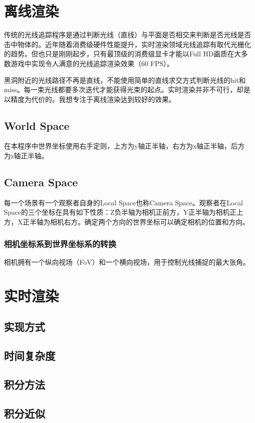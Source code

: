 \section{离线渲染}
传统的光线追踪程序是通过判断光线（直线）与平面是否相交来判断是否光线是否击中物体的。近年随着消费级硬件性能提升，实时渲染领域光线追踪有取代光栅化的趋势。但也只是刚刚起步，只有最顶级的消费级显卡才能以Full HD画质在大多数游戏中实现令人满意的光线追踪渲染效果（60 FPS）。

黑洞附近的光线路径不再是直线，不能使用简单的直线求交方式判断光线的hit和miss。每一束光线都要多次迭代才能获得光束的起点。实时渲染并非不可行，却是以精度为代价的。我想专注于离线渲染达到较好的效果。
\subsection{World Space}
在本程序中世界坐标使用右手定则，上方为y轴正半轴，右方为x轴正半轴，后方为z轴正半轴。



\subsection{Camera Space}
每一个场景有一个观察者自身的Local Space也称Camera Space。观察者在Local Space的三个坐标在具有如下性质：Z负半轴为相机正前方，Y正半轴为相机正上方，X正半轴为相机右方。确定两个方向的世界坐标可以确定相机的位置和方向。

\subsubsection{相机坐标系到世界坐标系的转换}


相机拥有一个纵向视场（FoV）和一个横向视场，用于控制光线捕捉的最大张角。



\section{实时渲染}
\subsection{实现方式}
\subsection{时间复杂度}
\subsection{积分方法}
\subsection{积分近似}